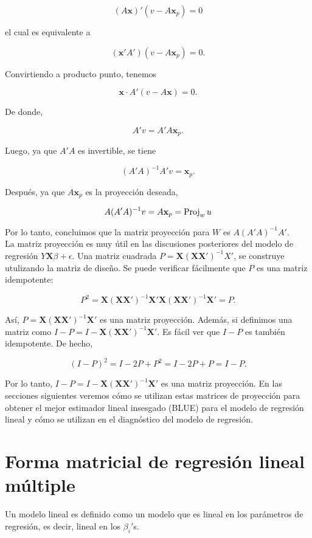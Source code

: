 $$(A\textbf{x})'(v-A\textbf{x}_p)=0$$

el cual es equivalente a

$$(\textbf{x}'A')(v-A\textbf{x}_p)=0.$$

Convirtiendo a producto punto, tenemos

$$\textbf{x}\cdot A'(v-A\textbf{x})=0.$$

De donde,

$$A'v=A'A\textbf{x}_p.$$

Luego, ya que $A'A$ es invertible, se tiene

$$(A'A)^{-1}A'v = \textbf{x}_p.$$

Después, ya que $A\textbf{x}_p$ es la proyección deseada,

$$A(A'A)^{-1}v=A\textbf{x}_p=\mathop{\mbox{\normalfont Proj}}\nolimits_w u$$

Por lo tanto, concluimos que la matriz proyección para $W$ es $A(A'A)^{-1}A'.$\\

La matriz proyección es muy útil en las discusiones posteriores del modelo de regresión $Y\textbf{X}\beta+\epsilon$. Una matriz cuadrada $P=\textbf{X}(\textbf{X}\textbf{X}')^{-1}X'$, se construye utulizando la matriz de diseño. Se puede verificar fácilmente que $P$ es una matriz idempotente:

$$P^2=\textbf{X}(\textbf{X}\textbf{X}')^{-1}\textbf{X}'\textbf{X}(\textbf{X}\textbf{X}')^{-1}\textbf{X}'=P.$$

Así, $P=\textbf{X}(\textbf{X}\textbf{X}')^{-1}\textbf{X}'$ es una matriz proyección. Además, si definimos una matriz como $I-P=I-\textbf{X}(\textbf{X}\textbf{X}')^{-1}\textbf{X}'$. Es fácil ver que $I-P$ es también idempotente. De hecho,

$$(I-P)^2=I-2P+P^2=I-2P+P=I-P.$$

Por lo tanto, $I-P=I-\textbf{X}(\textbf{X}\textbf{X}')^{-1}\textbf{X}'$ es una matriz proyección. En las secciones siguientes veremos cómo se utilizan estas matrices de proyección para obtener el mejor estimador lineal insesgado (BLUE) para el modelo de regresión lineal y cómo se utilizan en el diagnóstico del modelo de regresión.


\section{Forma matricial de regresión lineal múltiple}

\begin{def.}
    Un modelo lineal es definido como un modelo que es lineal en los parámetros de regresión, es decir, lineal en los $\beta_i'$s.
\end{def.}


